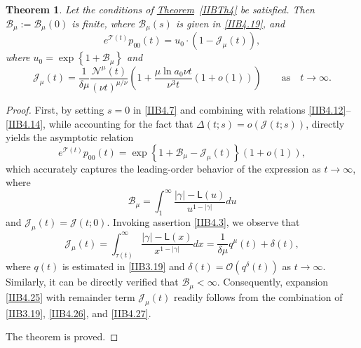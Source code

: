 \documentclass[10pt,reqno]{amsart}
\newtheorem{theorem}{Theorem}
\theoremstyle{definition}
\numberwithin{equation}{section}
\begin{document}
\begin{theorem}                      \label{IIBTh6}
    Let the conditions of {\hyperref[IIBTh4]{Theorem}~\ref{IIBTh4}} be satisfied. Then
    ${{\mathcal{B}}_{\mu}}:={{\mathcal{B}}_{\mu}}(0)$ is finite, where ${{\mathcal{B}}_{\mu}}(s)$ is
    given in {\eqref{IIB4.19}}, and
\begin{equation}                \label{IIB4.25}
    {{e}^{\mathcal{T}(t)}}{{p}_{00}}(t)={{u}_{0}}\cdot \left(1-{{\mathcal{J}}_{\mu}}(t)\right),
\end{equation}
    where ${{u}_{0}}=\exp\left\{1+{{\mathcal{B}}_{\mu}}\right\}$ and
\[
    {{\mathcal{J}}_{\mu }}(t)=\frac{1}{\delta\mu}\frac{{{\mathcal{N}}^{\mu}}(t)}{{(\nu{t})}^{{\mu}/{\nu}}}
    \left(1+\frac{\mu\ln{{a}_{0}}\nu{t}}{{{\nu}^{3}}t}\left(1+o(1)\right)\right) \qquad {\text{as}} \quad {t\to\infty}.
\]
\end{theorem}

\begin{proof}
    First, by setting $s=0$ in {\eqref{IIB4.7}} and combining with relations {\eqref{IIB4.12}}--{\eqref{IIB4.14}},
    while accounting for the fact that $\Delta (t;s)=o\left(\mathcal{J}(t;s)\right)$, directly yields the asymptotic
    relation
\begin{equation}                \label{IIB4.26}
    {e^{\mathcal{T}(t)}}{p_{00}}(t)=
    \exp\left\{1+{{\mathcal{B}}_{\mu}}-{{\mathcal{J}}_{\mu}}(t)\right\}\left(1+o(1)\right),
\end{equation}
    which accurately captures the leading-order behavior of the expression as $t\to\infty$, where
\[
    {{\mathcal{B}}_{\mu}}=\int_{1}^{\infty}{\frac{|\gamma|-\textsf{L}(u)}{{{u}^{1-|\gamma|}}}du}
\]
    and ${{\mathcal{J}}_{\mu }}(t)=\mathcal{J}(t;0)$. Invoking assertion {\eqref{IIB4.3}}, we observe that
\begin{equation}                \label{IIB4.27}
    {{\mathcal{J}}_{\mu}}(t)=\int_{\tau(t)}^{\infty}{\frac{|\gamma|-\textsf{L}(x)}{{x^{1-|\gamma|}}}dx}
    =\frac{1}{\delta \mu }{q^{\mu}}(t)+\delta(t),
\end{equation}
    where $q(t)$ is estimated in {\eqref{IIB3.19}} and $\delta(t)=\mathcal{O}\left({{q}^{\delta}}(t)\right)$
    as $t\to\infty$. Similarly, it can be directly verified that ${{\mathcal{B}}_{\mu}}<\infty$. Consequently,
    expansion {\eqref{IIB4.25}} with remainder term ${{\mathcal{J}}_{\mu}}(t)$ readily follows from the
    combination of {\eqref{IIB3.19}}, {\eqref{IIB4.26}}, and {\eqref{IIB4.27}}.

    The theorem is proved.
\end{proof}
\end{document}
